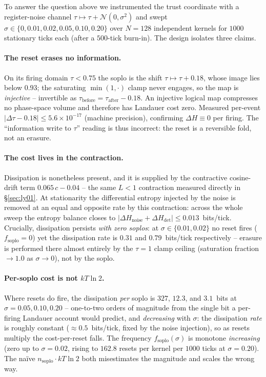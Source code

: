 \documentclass[11pt, a4paper]{article}
\begin{document}
To answer the question above we instrumented the trust coordinate with a
register-noise channel $\tau \mapsto \tau + \mathcal{N}(0,\sigma^2)$ and swept
$\sigma \in \{0, 0.01, 0.02, 0.05, 0.10, 0.20\}$ over $N=128$ independent kernels
for $1000$ stationary ticks each (after a $500$-tick burn-in). The design
isolates three claims.

\paragraph{The reset erases no information.}
On its firing domain $\tau < 0.75$ the soplo is the shift $\tau \mapsto \tau +
0.18$, whose image lies below $0.93$; the saturating $\min(1,\cdot)$ clamp never
engages, so the map is \emph{injective} -- invertible as $\tau_\text{before} =
\tau_\text{after} - 0.18$. An injective logical map compresses no phase-space
volume and therefore has Landauer cost zero. Measured per-event $\lvert\Delta\tau
- 0.18\rvert \le 5.6\times 10^{-17}$ (machine precision), confirming $\Delta H
\equiv 0$ per firing. The ``information write to $\tau$'' reading is thus
incorrect: the reset is a reversible fold, not an erasure.

\paragraph{The cost lives in the contraction.}
Dissipation is nonetheless present, and it is supplied by the contractive
cosine-drift term $0.065\,c - 0.04$ -- the same $L<1$ contraction measured
directly in \S\ref{sec:ly01}. At stationarity the differential entropy injected
by the noise is removed at an equal and opposite rate by this contraction: across
the whole sweep the entropy balance closes to $\lvert \Delta H_\text{noise} +
\Delta H_\text{det}\rvert \le 0.013$~bits/tick. Crucially, dissipation persists
\emph{with zero soplos}: at $\sigma \in \{0.01, 0.02\}$ no reset fires
($f_\text{soplo}=0$) yet the dissipation rate is $0.31$ and $0.79$~bits/tick
respectively -- erasure is performed there almost entirely by the $\tau=1$ clamp
ceiling (saturation fraction $\to 1.0$ as $\sigma \to 0$), not by the soplo.

\paragraph{Per-soplo cost is not $kT\ln 2$.}
Where resets do fire, the dissipation \emph{per} soplo is $327$, $12.3$, and
$3.1$~bits at $\sigma = 0.05, 0.10, 0.20$ -- one-to-two orders of magnitude from
the single bit a per-firing Landauer account would predict, and \emph{decreasing}
with $\sigma$: the dissipation \emph{rate} is roughly constant ($\approx
0.5$~bits/tick, fixed by the noise injection), so as resets multiply the
cost-per-reset falls. The frequency $f_\text{soplo}(\sigma)$ is monotone
\emph{increasing} (zero up to $\sigma=0.02$, rising to $162.8$ resets per kernel
per $1000$ ticks at $\sigma=0.20$). The naïve $n_\text{soplo}\cdot kT\ln 2$ both
misesti\-mates the magnitude and scales the wrong way.
\end{document}
